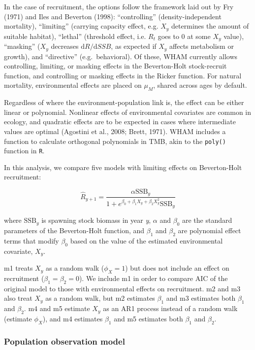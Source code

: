 \documentclass[]{article}
\begin{document}
In the case of recruitment, the options follow the framework laid out by
Fry (1971) and Iles and Beverton (1998): ``controlling''
(density-independent mortality), ``limiting'' (carrying capacity effect,
e.g. \(X_y\) determines the amount of suitable habitat), ``lethal''
(threshold effect, i.e. \(R_t\) goes to 0 at some \(X_y\) value),
``masking'' (\(X_y\) decreases \(\text{d}R/\text{d}SSB\), as expected if
\(X_y\) affects metabolism or growth), and ``directive''
(e.g.~behavioral). Of these, WHAM currently allows controlling,
limiting, or masking effects in the Beverton-Holt stock-recruit
function, and controlling or masking effects in the Ricker function. For
natural mortality, environmental effects are placed on \(\mu_M\), shared
across ages by default.

Regardless of where the environment-population link is, the effect can
be either linear or polynomial. Nonlinear effects of environmental
covariates are common in ecology, and quadratic effects are to be
expected in cases where intermediate values are optimal (Agostini et
al., 2008; Brett, 1971). WHAM includes a function to calculate
orthogonal polynomials in TMB, akin to the \texttt{poly()} function in
\texttt{R}.

In this analysis, we compare five models with limiting effects on
Beverton-Holt recruitment:

\[\hat{R}_{y+1} = \frac{\alpha \text{SSB}_{y}}{1 + e^{\beta_0 + \beta_1 X_{y} + \beta_2 X^2_{y}} \text{SSB}_y}\]

where \(\text{SSB}_y\) is spawning stock biomass in year \emph{y},
\(\alpha\) and \(\beta_0\) are the standard parameters of the
Beverton-Holt function, and \(\beta_1\) and \(\beta_2\) are polynomial
effect terms that modify \(\beta_0\) based on the value of the estimated
environmental covariate, \(X_y\).

m1 treats \(X_y\) as a random walk (\(\phi_X = 1\)) but does not include
an effect on recruitment (\(\beta_1 = \beta_2 = 0\)). We include m1 in
order to compare AIC of the original model to those with environmental
effects on recruitment. m2 and m3 also treat \(X_y\) as a random walk,
but m2 estimates \(\beta_1\) and m3 estimates both \(\beta_1\) and
\(\beta_2\). m4 and m5 estimate \(X_y\) as an AR1 process instead of a
random walk (estimate \(\phi_X\)), and m4 estimates \(\beta_1\) and m5
estimates both \(\beta_1\) and \(\beta_2\).

\hypertarget{population-observation-model}{%
\subsubsection{Population observation
model}\label{population-observation-model}}
\end{document}
